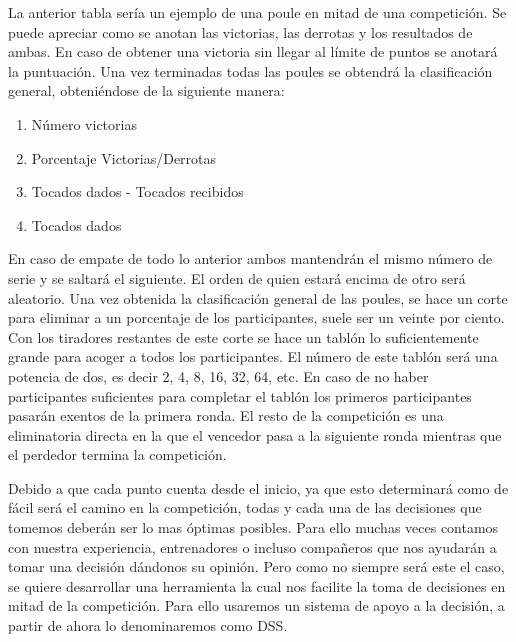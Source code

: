 La anterior tabla sería un ejemplo de una poule en mitad de una competición. Se puede apreciar como se anotan
 las victorias, las derrotas y los resultados de ambas. En caso de obtener una victoria sin llegar al límite de puntos se anotará la puntuación. Una vez
 terminadas todas las poules se obtendrá la clasificación general, obteniéndose de la siguiente manera:

\begin{enumerate}
  \item Número victorias
  \item Porcentaje Victorias/Derrotas
  \item Tocados dados - Tocados recibidos
  \item Tocados dados
\end{enumerate}

En caso de empate de todo lo anterior ambos mantendrán el mismo número de serie y se saltará el siguiente. El orden de
 quien estará encima de otro será aleatorio. Una vez obtenida la clasificación general de las poules, se hace un corte
 para eliminar a un porcentaje de los participantes, suele ser un veinte por ciento. Con los tiradores restantes
 de este corte se hace un tablón lo suficientemente grande para acoger a todos los participantes. El número de este
 tablón será una potencia de dos, es decir 2, 4, 8, 16, 32, 64, etc. En caso de no haber participantes suficientes para completar
 el tablón los primeros participantes pasarán exentos de la primera ronda. El resto de la competición es una eliminatoria
 directa en la que el vencedor pasa a la siguiente ronda mientras que el perdedor termina la competición.

Debido a que cada punto cuenta desde el inicio, ya que esto determinará como de fácil será el camino en la competición,
todas y cada una de las decisiones que tomemos deberán ser lo mas óptimas posibles. Para ello muchas veces contamos
con nuestra experiencia, entrenadores o incluso compañeros que nos ayudarán a tomar una decisión dándonos su opinión.
Pero como no siempre será este el caso, se quiere desarrollar una herramienta la cual nos facilite la toma de
decisiones en mitad de la competición. Para ello usaremos un sistema de apoyo a la decisión, a partir de ahora
lo denominaremos como \acf{DSS}.
